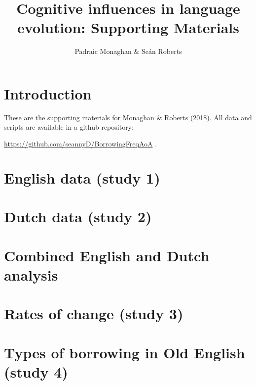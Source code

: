\documentclass[12pt]{article}
\title{Cognitive influences in language evolution: Supporting Materials}
\author{Padraic Monaghan \& Se\'{a}n Roberts}
\begin{document}
\maketitle

\tableofcontents

\section{Introduction}

These are the supporting materials for Monaghan \& Roberts (2018). All data and scripts are available in a github repository: 

\hyperref[https://github.com/seannyD/BorrowingFreqAoA]{https://github.com/seannyD/BorrowingFreqAoA} .

\newpage
\section{English data (study 1)}


\newpage
\section{Dutch data (study 2)}


\newpage
\section{Combined English and Dutch analysis}


\newpage
\section{Rates of change (study 3)}


\newpage
\section{Types of borrowing in Old English (study 4)}


\end{document}
